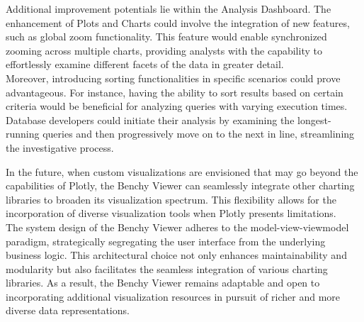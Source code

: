 Additional improvement potentials lie within the Analysis Dashboard. The enhancement of Plots and Charts could involve the integration of new features, such as global zoom functionality. This feature would enable synchronized zooming across multiple charts, providing analysts with the capability to effortlessly examine different facets of the data in greater detail.\\
Moreover, introducing sorting functionalities in specific scenarios could prove advantageous. For instance, having the ability to sort results based on certain criteria would be beneficial for analyzing queries with varying execution times. Database developers could initiate their analysis by examining the longest-running queries and then progressively move on to the next in line, streamlining the investigative process.

In the future, when custom visualizations are envisioned that may go beyond the capabilities of Plotly, the Benchy Viewer can seamlessly integrate other charting libraries to broaden its visualization spectrum. This flexibility allows for the incorporation of diverse visualization tools when Plotly presents limitations.\\
The system design of the Benchy Viewer adheres to the model-view-viewmodel paradigm, strategically segregating the user interface from the underlying business logic. This architectural choice not only enhances maintainability and modularity but also facilitates the seamless integration of various charting libraries. As a result, the Benchy Viewer remains adaptable and open to incorporating additional visualization resources in pursuit of richer and more diverse data representations.







